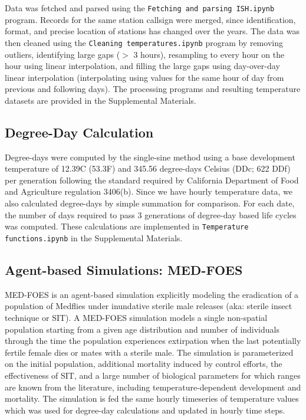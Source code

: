 \documentclass[10pt,a4paper,twocolumn]{article}
\begin{document}
Data was fetched and parsed using the \texttt{Fetching and parsing ISH.ipynb} program.
Records for the same station callsign were merged, since identification, format, 
and precise location of stations has changed over the years.
The data was then cleaned using the 
\texttt{Cleaning temperatures.ipynb} program by 
removing outliers, 
identifying large gaps ($>$ 3 hours), 
resampling to every hour on the hour using linear interpolation,
and filling the large gaps using day-over-day linear interpolation
(interpolating using values for the same hour of day from previous and following days).
The processing programs and resulting temperature datasets are 
provided in the Supplemental Materials.


\subsection*{Degree-Day Calculation}
Degree-days were computed by the single-sine method\cite{ECY:ECY1969503514}
using a base development temperature of 12.39\degree C (53.3\degree F) 
and 345.56 degree-days Celsius (DDc; 622 DDf) per generation 
following the standard required by California Department of Food and Agriculture
regulation 3406(b)\cite{CDFA_Medfly,3-CA-ADC-3406}.
Since we have hourly temperature data, we also calculated degree-days by simple summation
for comparison\cite{Roltsch1999}.
For each date, the number of days required to pass 3 generations of degree-day 
based life cycles was computed.
These calculations are implemented in \texttt{Temperature functions.ipynb} in the Supplemental Materials.


\subsection*{Agent-based Simulations: MED-FOES}

MED-FOES\cite{manoukis_computer_2014,manoukis_agent-based_2014} is 
an agent-based simulation explicitly modeling the eradication of a population of Medflies 
under inundative sterile male releases (aka: sterile insect technique or SIT).
A MED-FOES simulation models a single non-spatial population starting from a given age distribution 
and number of individuals through the time the population experiences extirpation when the last 
potentially fertile female dies or mates with a sterile male.
The simulation is parameterized on the initial population, additional mortality induced by control efforts,
the effectiveness of SIT, and a large number of biological parameters for which ranges are known from 
the literature, including temperature-dependent development and mortality.
The simulation is fed the same hourly timeseries of temperature values which was used for degree-day calculations
and updated in hourly time steps.
\end{document}
